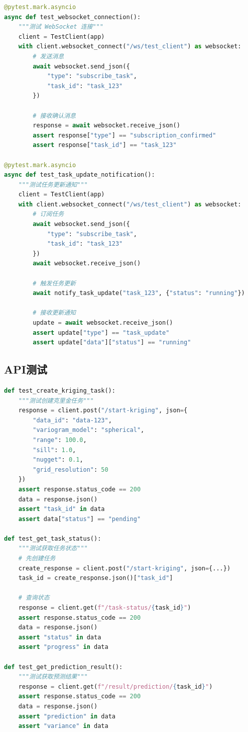\documentclass[12pt,a4paper,openany]{report}
\begin{document}
\begin{lstlisting}[language=Python, caption=WebSocket异步测试]
@pytest.mark.asyncio
async def test_websocket_connection():
    """测试 WebSocket 连接"""
    client = TestClient(app)
    with client.websocket_connect("/ws/test_client") as websocket:
        # 发送消息
        await websocket.send_json({
            "type": "subscribe_task",
            "task_id": "task_123"
        })

        # 接收确认消息
        response = await websocket.receive_json()
        assert response["type"] == "subscription_confirmed"
        assert response["task_id"] == "task_123"

@pytest.mark.asyncio
async def test_task_update_notification():
    """测试任务更新通知"""
    client = TestClient(app)
    with client.websocket_connect("/ws/test_client") as websocket:
        # 订阅任务
        await websocket.send_json({
            "type": "subscribe_task",
            "task_id": "task_123"
        })
        await websocket.receive_json()

        # 触发任务更新
        await notify_task_update("task_123", {"status": "running"})

        # 接收更新通知
        update = await websocket.receive_json()
        assert update["type"] == "task_update"
        assert update["data"]["status"] == "running"
\end{lstlisting}

\subsection{API测试}

\begin{lstlisting}[language=Python, caption=API端点测试]
def test_create_kriging_task():
    """测试创建克里金任务"""
    response = client.post("/start-kriging", json={
        "data_id": "data-123",
        "variogram_model": "spherical",
        "range": 100.0,
        "sill": 1.0,
        "nugget": 0.1,
        "grid_resolution": 50
    })
    assert response.status_code == 200
    data = response.json()
    assert "task_id" in data
    assert data["status"] == "pending"

def test_get_task_status():
    """测试获取任务状态"""
    # 先创建任务
    create_response = client.post("/start-kriging", json={...})
    task_id = create_response.json()["task_id"]

    # 查询状态
    response = client.get(f"/task-status/{task_id}")
    assert response.status_code == 200
    data = response.json()
    assert "status" in data
    assert "progress" in data

def test_get_prediction_result():
    """测试获取预测结果"""
    response = client.get(f"/result/prediction/{task_id}")
    assert response.status_code == 200
    data = response.json()
    assert "prediction" in data
    assert "variance" in data
\end{lstlisting}
\end{document}
